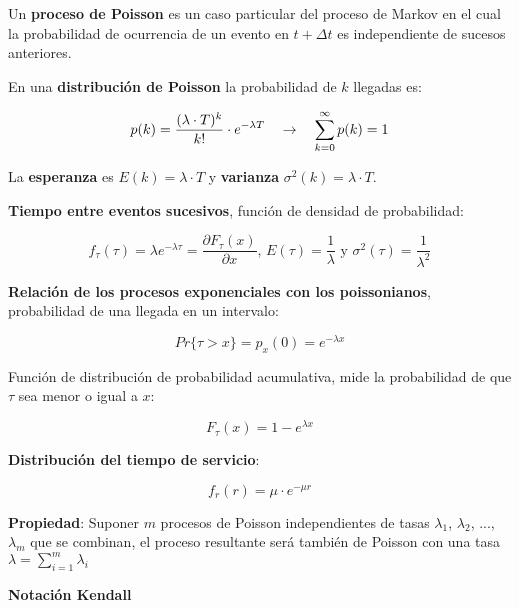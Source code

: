 \documentclass[9pt,landscape]{extarticle}
\begin{document}
\begin{multicols}{3}
Un \textbf{proceso de Poisson} es un caso particular del proceso de Markov en el cual la probabilidad de ocurrencia de un evento en $t + \Delta t$ es independiente de sucesos anteriores.

En una \textbf{distribución de Poisson} la probabilidad de $k$ llegadas es:

	\begin{equation*}
		p(k) = \frac{(\lambda \cdot T)^k}{k!} \cdot e^{- \lambda T} \hspace{10 pt} \rightarrow \hspace{10 pt}  \sum_{k=0}^{\infty} p(k) = 1
	\end{equation*}
	
La \textbf{esperanza} es $E(k)= \lambda \cdot T$ y \textbf{varianza} $\sigma^{2} (k) = \lambda \cdot T$.


\textbf{Tiempo entre eventos sucesivos}, función de densidad de probabilidad:

	\begin{equation*}
		f_{\tau} (\tau) = \lambda e^{- \lambda \tau}	 = \frac{\partial F_{\tau}(x)}{\partial x} \text{,   } E(\tau) = \frac{1}{\lambda} \text{  y } \sigma^{2} (\tau) = \frac{1}{\lambda^{2}}
	\end{equation*}


\textbf{Relación de los procesos exponenciales con los poissonianos}, probabilidad de una llegada en un intervalo:

	\begin{equation*}
		Pr\{ \tau > x \} = p_{x}(0) = e^{-\lambda x}
	\end{equation*}
	
Función de distribución de probabilidad acumulativa, mide la probabilidad de que $\tau$ sea menor o igual a $x$:

	\begin{equation*}
		F_{\tau}(x) = 1 - e^{\lambda x}
	\end{equation*}
	
\textbf{Distribución del tiempo de servicio}:

	\begin{equation*}
	f_{r}(r) = \mu \cdot e^{- \mu r}
	\end{equation*}

\textbf{Propiedad}: Suponer $m$ procesos de Poisson independientes de tasas $\lambda_{1}$, $\lambda_{2}$, ..., $\lambda_{m}$ que se combinan, el proceso resultante será también de Poisson con una tasa $\lambda = \sum_{i = 1}^{m} \lambda_{i}$
	
	\quad \textbf{Notación Kendall}
%	
	

\end{multicols}
\end{document}
